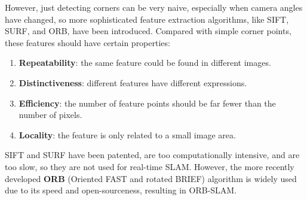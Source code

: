 \documentclass{article}
\theoremstyle{definition}
\theoremstyle{remark}
\theoremstyle{definition}
\begin{document}
However, just detecting corners can be very naive, especially when camera angles have changed, so more sophisticated feature extraction algorithms, like SIFT, SURF, and ORB, have been introduced. Compared with simple corner points, these features should have certain properties: 
\begin{enumerate}
    \item \textbf{Repeatability}: the same feature could be found in different images. 
    \item \textbf{Distinctiveness}: different features have different expressions. 
    \item \textbf{Efficiency}: the number of feature points should be far fewer than the number of pixels. 
    \item \textbf{Locality}: the feature is only related to a small image area. 
\end{enumerate}
SIFT and SURF have been patented, are too computationally intensive, and are too slow, so they are not used for real-time SLAM. However, the more recently developed \textbf{ORB} (Oriented FAST and rotated BRIEF) algorithm is widely used due to its speed and open-sourceness, resulting in ORB-SLAM. 
\end{document}
